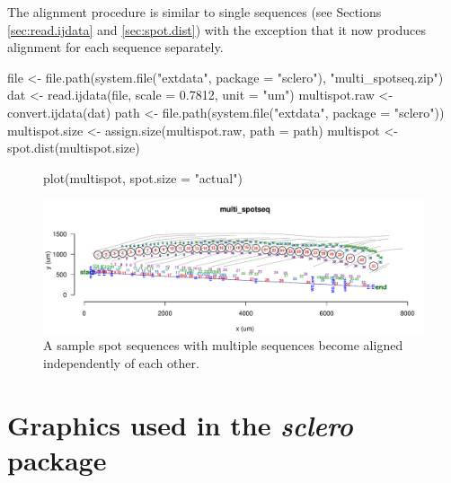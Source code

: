 \documentclass[11pt, a4paper]{article}
\newcommand{\sclero}{\textit{sclero}\xspace}
\begin{document}
The alignment procedure is similar to single sequences (see Sections \ref{sec:read.ijdata} and \ref{sec:spot.dist}) with the exception that it now produces alignment for each sequence separately.

\begin{Schunk}
\begin{Sinput}
 file <- file.path(system.file("extdata", package = "sclero"), "multi_spotseq.zip")
 dat <- read.ijdata(file, scale = 0.7812, unit = "um")
 multispot.raw <- convert.ijdata(dat)
 path <- file.path(system.file("extdata", package = "sclero"))
 multispot.size <- assign.size(multispot.raw, path = path)
 multispot <- spot.dist(multispot.size)
\end{Sinput}
\end{Schunk}

\begin{figure}[H]
\begin{center}
\begin{Schunk}
\begin{Sinput}
 plot(multispot, spot.size = "actual")
\end{Sinput}
\end{Schunk}
\includegraphics{sclero_tutorial-multispot}
\end{center}
\caption{A sample spot sequences with multiple sequences become aligned independently of each other.}
\end{figure}

\section{Graphics used in the \sclero package}
\end{document}
